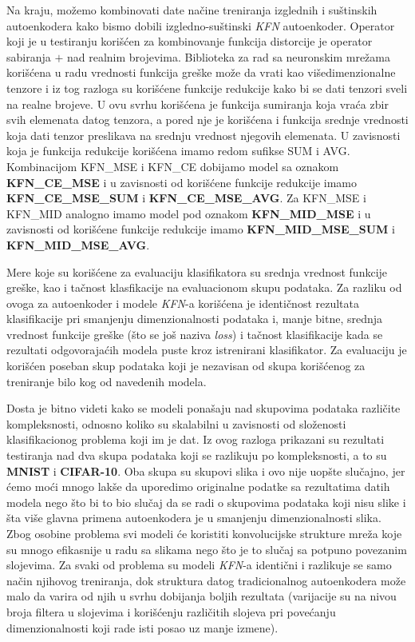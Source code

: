 \documentclass{article}
\begin{document}
	Na kraju, mo\v zemo kombinovati date na\v cine treniranja izglednih i su\v stinskih autoenkodera kako bismo dobili izgledno-su\v stinski \emph{KFN} autoenkoder.
	Operator koji je u testiranju kori\v s\'cen za kombinovanje funkcija distorcije je operator sabiranja $+$ nad realnim brojevima.
	Biblioteka za rad sa neuronskim mre\v zama kori\v s\'cena u radu vrednosti funkcija gre\v ske mo\v ze da vrati kao vi\v sedimenzionalne tenzore i iz tog razloga su kori\v s\'cene funkcije redukcije kako bi se dati tenzori sveli na realne brojeve.
	U ovu svrhu kori\v s\'cena je funkcija sumiranja koja vra\'ca zbir svih elemenata datog tenzora, a pored nje je kori\v s\'cena i funkcija srednje vrednosti koja dati tenzor preslikava na srednju vrednost njegovih elemenata.
	U zavisnosti koja je funkcija redukcije kori\v s\'cena imamo redom sufikse SUM i AVG.
	Kombinacijom KFN\_MSE i KFN\_CE dobijamo model sa oznakom \textbf{KFN\_CE\_MSE} i u zavisnosti od kori\v s\'cene funkcije redukcije imamo \textbf{KFN\_CE\_MSE\_SUM} i \textbf{KFN\_CE\_MSE\_AVG}.
	Za KFN\_MSE i KFN\_MID analogno imamo model pod oznakom \textbf{KFN\_MID\_MSE} i u zavisnosti od kori\v s\'cene funkcije redukcije imamo \textbf{KFN\_MID\_MSE\_SUM} i \textbf{KFN\_MID\_MSE\_AVG}.
	
	Mere koje su kori\v s\'cene za evaluaciju klasifikatora su srednja vrednost funkcije gre\v ske, kao i ta\v cnost klasfikacije na evaluacionom skupu podataka.
	Za razliku od ovoga za autoenkoder i modele \emph{KFN}-a kori\v s\'cena je identi\v cnost rezultata klasifikacije pri smanjenju dimenzionalnosti podataka i, manje bitne, srednja vrednost funkcije gre\v ske (\v sto se jo\v s naziva \emph{loss}) i ta\v cnost klasifikacije kada se rezultati odgovoraja\'cih modela puste kroz istrenirani klasifikator.
	Za evaluaciju je kori\v s\'cen poseban skup podataka koji je nezavisan od skupa kori\v s\'cenog za treniranje bilo kog od navedenih modela.
	
	Dosta je bitno videti kako se modeli pona\v saju nad skupovima podataka razli\v cite kompleksnosti, odnosno koliko su skalabilni u zavisnosti od slo\v zenosti klasifikacionog problema koji im je dat.
	Iz ovog razloga prikazani su rezultati testiranja nad dva skupa podataka koji se razlikuju po kompleksnosti, a to su \textbf{MNIST} i \textbf{CIFAR-10}.
	Oba skupa su skupovi slika i ovo nije uop\v ste slu\v cajno, jer \'cemo mo\'ci mnogo lak\v se da uporedimo originalne podatke sa rezultatima datih modela nego \v sto bi to bio slu\v caj da se radi o skupovima podataka koji nisu slike i \v sta vi\v se glavna primena autoenkodera je u smanjenju dimenzionalnosti slika.
	Zbog osobine problema svi modeli \'ce koristiti konvolucijske strukture mre\v za koje su mnogo efikasnije u radu sa slikama nego \v sto je to slu\v caj sa potpuno povezanim slojevima.
	Za svaki od problema su modeli \emph{KFN}-a identi\v cni  i razlikuje se samo na\v cin njihovog treniranja, dok struktura datog tradicionalnog autoenkodera mo\v ze malo da varira od njih u svrhu dobijanja boljih rezultata (varijacije su na nivou broja filtera u slojevima i kori\v s\'cenju razli\v citih slojeva pri pove\'canju dimenzionalnosti koji rade isti posao uz manje izmene).
	
\end{document}
